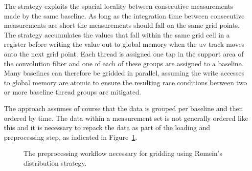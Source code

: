 The strategy exploits the spacial locality between consecutive measurements made by the same baseline. As long as the integration time
between consecutive measurements are short the measurements should fall on the same grid points. The strategy accumulates the values that fall 
within the same grid cell in a register before writing the value out to global memory when the uv track moves onto the next grid point.
Each thread is assigned one tap in the support area of the convolution filter and one of each of these groups are assigned to a baseline.
Many baselines can therefore be gridded in parallel, assuming the write accesses to global memory are atomic to ensure the resulting race conditions
between two or more baseline thread groups are mitigated.

The approach assumes of course that the data is grouped per baseline and then ordered by time.
The data within a measurement set is not generally ordered like this and it is necessary to repack the 
data as part of the loading and preprocessing step, as indicated in Figure~\ref{fig_gpu_preprocess}.
\begin{figure}[ht!]
 \begin{mdframed}
 \centering
 \caption[GPU preprocessing workflow]{The preprocessing workflow necessary for gridding using
 Romein's distribution strategy.}
 \label{fig_gpu_preprocess}
 \end{mdframed}
\end{figure}

